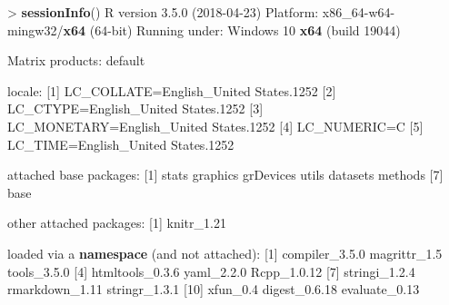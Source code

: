 \documentclass[]{article}
\newenvironment{Shaded}{\begin{snugshade}}{\end{snugshade}}
\newcommand{\KeywordTok}[1]{\textcolor[rgb]{0.13,0.29,0.53}{\textbf{{#1}}}}
\newcommand{\DecValTok}[1]{\textcolor[rgb]{0.00,0.00,0.81}{{#1}}}
\newcommand{\FloatTok}[1]{\textcolor[rgb]{0.00,0.00,0.81}{{#1}}}
\newcommand{\StringTok}[1]{\textcolor[rgb]{0.31,0.60,0.02}{{#1}}}
\newcommand{\NormalTok}[1]{{#1}}
\begin{document}
\begin{Shaded}
\begin{Highlighting}[]
\NormalTok{>}\StringTok{ }\KeywordTok{sessionInfo}\NormalTok{()}
\NormalTok{R version }\FloatTok{3.5.0} \NormalTok{(}\DecValTok{2018-04-23}\NormalTok{)}
\NormalTok{Platform:}\StringTok{ }\NormalTok{x86_64-w64-mingw32/}\KeywordTok{x64} \NormalTok{(}\DecValTok{64}\NormalTok{-bit)}
\NormalTok{Running under:}\StringTok{ }\NormalTok{Windows }\DecValTok{10} \KeywordTok{x64} \NormalTok{(build }\DecValTok{19044}\NormalTok{)}

\NormalTok{Matrix products:}\StringTok{ }\NormalTok{default}

\NormalTok{locale:}
\NormalTok{[}\DecValTok{1}\NormalTok{] LC_COLLATE=English_United States}\FloatTok{.1252} 
\NormalTok{[}\DecValTok{2}\NormalTok{] LC_CTYPE=English_United States}\FloatTok{.1252}   
\NormalTok{[}\DecValTok{3}\NormalTok{] LC_MONETARY=English_United States}\FloatTok{.1252}
\NormalTok{[}\DecValTok{4}\NormalTok{] LC_NUMERIC=C                          }
\NormalTok{[}\DecValTok{5}\NormalTok{] LC_TIME=English_United States}\FloatTok{.1252}    

\NormalTok{attached base packages:}
\NormalTok{[}\DecValTok{1}\NormalTok{] stats     graphics  grDevices utils     datasets  methods  }
\NormalTok{[}\DecValTok{7}\NormalTok{] base     }

\NormalTok{other attached packages:}
\NormalTok{[}\DecValTok{1}\NormalTok{] knitr_1}\FloatTok{.21}

\NormalTok{loaded via a }\KeywordTok{namespace} \NormalTok{(and not attached):}
\StringTok{ }\NormalTok{[}\DecValTok{1}\NormalTok{] compiler_3}\FloatTok{.5.0}  \NormalTok{magrittr_1}\FloatTok{.5}    \NormalTok{tools_3}\FloatTok{.5.0}    
 \NormalTok{[}\DecValTok{4}\NormalTok{] htmltools_0}\FloatTok{.3.6} \NormalTok{yaml_2}\FloatTok{.2.0}      \NormalTok{Rcpp_1}\FloatTok{.0.12}    
 \NormalTok{[}\DecValTok{7}\NormalTok{] stringi_1}\FloatTok{.2.4}   \NormalTok{rmarkdown_1}\FloatTok{.11}  \NormalTok{stringr_1}\FloatTok{.3.1}  
\NormalTok{[}\DecValTok{10}\NormalTok{] xfun_0}\FloatTok{.4}        \NormalTok{digest_0}\FloatTok{.6.18}   \NormalTok{evaluate_0}\FloatTok{.13}  
\end{Highlighting}
\end{Shaded}
\end{document}
